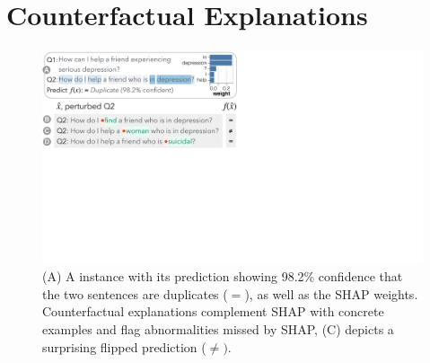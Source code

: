
\newcommand{\fwone}[1]{\colbox{cfwone}{#1}\xspace}
\newcommand{\fwtwo}[1]{\colbox{cfwtwo}{#1}\xspace}
\newcommand{\fwthree}[1]{\colbox{cfwthree}{#1}\xspace}
\newcommand{\fwfour}[1]{\colbox{cfwfour}{#1}\xspace}

\newcommand{\fexp}[2]{\texttt{[{\color{darkgray}{#1:#2}}]}\xspace}
\newcommand{\fexptag}[1]{\fexp{TAG}{#1}}
\newcommand{\fexpfrom}[1]{\fexp{FROM}{#1}}
\newcommand{\fexpto}[1]{\fexp{TO}{#1}}
\newcommand{\fexptemp}[1]{\fexp{TEMP}{#1}}


\section{Counterfactual Explanations}
\label{sec:app_explain}

\begin{figure}[t]
\centering
\includegraphics[trim={0 21cm 33cm 0cm},clip,width=1\columnwidth]{figures/explanation_v2.pdf}
\vspace{-15pt}
\caption{
(A) A \qqp instance with its prediction\footnotemark{} showing 98.2\% confidence that the two sentences are duplicates ($=$), as well as the SHAP weights.
Counterfactual explanations complement SHAP with concrete examples and flag abnormalities missed by SHAP, \eg (C)
depicts a surprising flipped prediction ($\neq)$.
}
\vspace{-10pt}
\label{fig:explanation}
\end{figure}


